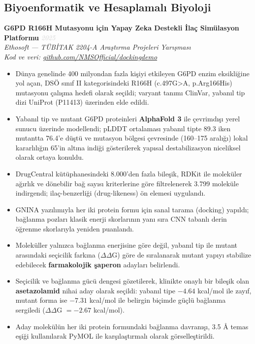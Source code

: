 \documentclass[11pt,a4paper]{article}
\newcommand{\blueitem}[1]{\textcolor{subtitleblue}{\textbf{#1}}}
\newcommand{\daterange}[1]{\hfill \textcolor{lightgray}{\textit{#1}}}
\begin{document}
\subsection*{Biyoenformatik ve Hesaplamalı Biyoloji}

\blueitem{G6PD R166H Mutasyonu için Yapay Zeka Destekli İlaç Simülasyon Platformu} \daterange{2025}\\
\textit{Ethosoft --- TÜBİTAK 2204-A Araştırma Projeleri Yarışması} \\
\textit{Kod ve veri: \href{https://github.com/NMSOfficial/dockingdemo}{github.com/NMSOfficial/dockingdemo}}
\begin{itemize}
    \item Dünya genelinde 400 milyondan fazla kişiyi etkileyen G6PD enzim eksikliğine yol açan, DSÖ sınıf II kategorisindeki R166H (c.497G>A, p.Arg166His) mutasyonu çalışma hedefi olarak seçildi; varyant tanımı ClinVar, yabanıl tip dizi UniProt (P11413) üzerinden elde edildi.
    \item Yabanıl tip ve mutant G6PD proteinleri \textbf{AlphaFold 3} ile çevrimdışı yerel sunucu üzerinde modellendi; pLDDT ortalaması yabanıl tipte 89.3 iken mutantta 76.4'e düştü ve mutasyon bölgesi çevresinde (160--175 aralığı) lokal kararlılığın 65'in altına indiği gösterilerek yapısal destabilizasyon niceliksel olarak ortaya konuldu.
    \item DrugCentral kütüphanesindeki 8.000'den fazla bileşik, RDKit ile moleküler ağırlık ve dönebilir bağ sayısı kriterlerine göre filtrelenerek 3.799 moleküle indirgendi; ilaç-benzerliği (drug-likeness) ön elemesi uygulandı.
    \item GNINA yazılımıyla her iki protein formu için sanal tarama (docking) yapıldı; bağlanma pozları klasik enerji skorlarının yanı sıra CNN tabanlı derin öğrenme skorlarıyla yeniden puanlandı.
    \item Moleküller yalnızca bağlanma enerjisine göre değil, yabanıl tip ile mutant arasındaki seçicilik farkına ($\Delta\Delta$G) göre de sıralanarak mutant yapıyı stabilize edebilecek \textbf{farmakolojik şaperon} adayları belirlendi.
    \item Seçicilik ve bağlanma gücü dengesi gözetilerek, klinikte onaylı bir bileşik olan \textbf{asetazolamid} nihai aday olarak seçildi: yabanıl tipe $-4.64$ kcal/mol ile zayıf, mutant forma ise $-7.31$ kcal/mol ile belirgin biçimde güçlü bağlanma sergiledi ($\Delta\Delta$G $= -2.67$ kcal/mol).
    \item Aday molekülün her iki protein formundaki bağlanma davranışı, 3.5 \AA{} temas eşiği kullanılarak PyMOL ile karşılaştırmalı olarak görselleştirildi.

\end{itemize}
\end{document}
